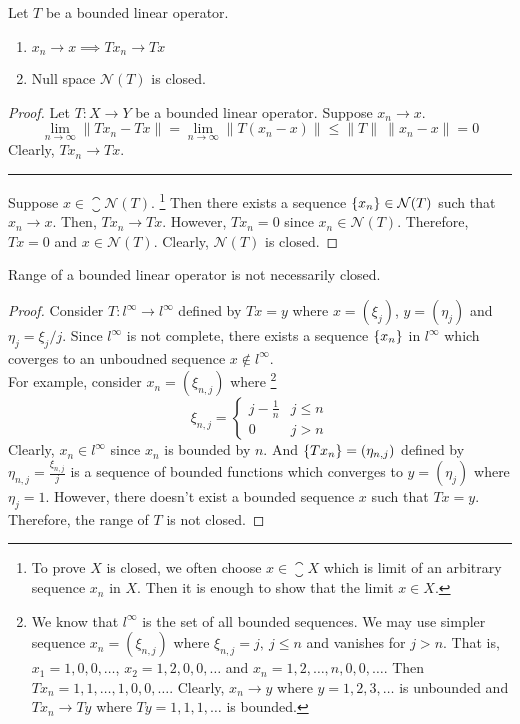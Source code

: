 \begin{corollary}
	Let $T$ be a bounded linear operator.
	\begin{enumerate}
		\item $x_n \to x \implies Tx_n \to Tx$
		\item Null space $\mathcal{N}(T)$ is closed.
	\end{enumerate}
\end{corollary}
\begin{proof}
	Let $T : X \to Y$ be a bounded linear operator.
	Suppose $x_n \to x$.
	\[ \lim_{n \to \infty} \|Tx_n - Tx\| = \lim_{n \to \infty} \|T(x_n-x)\| \le \|T\| \ \|x_n-x\| = 0 \]
	Clearly, $Tx_n \to Tx$.\\

	\hrule \vspace{1em}

	Suppose $x \in \closure{\mathcal{N}(T)}$.
	\dag\footnote{
		To prove $X$ is closed, we often choose $x \in \closure{X}$ which is limit of an arbitrary sequence $x_n$ in $X$.
		Then it is enough to show that the limit $x \in X$.}
	Then there exists a sequence $\left\{x_n\right\} \in \mathcal{N}(T)$ such that $x_n \to x$.
	Then, $Tx_n \to Tx$.
	However, $Tx_n = 0$ since $x_n \in \mathcal{N}(T)$.
	Therefore, $Tx = 0$ and $x \in \mathcal{N}(T)$.
	Clearly, $\mathcal{N}(T)$ is closed.
\end{proof}

\begin{remark}
	Range of a bounded linear operator is not necessarily closed.
\end{remark}
\begin{proof}
	Consider $T : l^\infty \to l^\infty$ defined by $Tx = y$ where $x = (\xi_j)$, $y = (\eta_j)$ and $\eta_j = \xi_j/j$.
	Since $l^\infty$ is not complete, there exists a sequence $\left\{x_n\right\}$ in $l^\infty$ which coverges to an unboudned sequence $x \notin l^\infty$.\\

	For example, consider $x_n = (\xi_{n,j})$ where\dag
	\footnote{
		We know that $l^\infty$ is the set of all bounded sequences.
		We may use simpler sequence $x_n = (\xi_{n,j})$ where $\xi_{n,j} = j,\ j \le n$ and vanishes for $j >n$.
		That is, $x_1 = 1,0,0,\dotsc$, $x_2 = 1,2,0,0,\dotsc$ and $x_n = 1,2,\dots,n,0,0,\dotsc$.
		Then $Tx_n = 1,1,\dots,1,0,0,\dotsc$.
		Clearly, $x_n \to y$ where $y = 1,2,3,\dotsc$ is unbounded and $Tx_n \to Ty$ where $Ty = 1,1,1,\dotsc$ is bounded.}
	\[\xi_{n,j} = \begin{cases} j-\frac{1}{n} & j \le n \\ 0 & j > n \end{cases} \]
	Clearly, $x_n \in l^\infty$ since $x_n$ is bounded by $n$.
	And $\left\{Tx_n\right\} = (\eta_{n,j})$ defined by $\eta_{n,j} =\frac{\xi_{n,j}}{j}$ is a sequence of bounded functions which converges to $y= (\eta_j)$ where $\eta_j = 1$.
	However, there doesn't exist a bounded sequence $x$ such that $Tx = y$.
	Therefore, the range of $T$ is not closed.
\end{proof}

